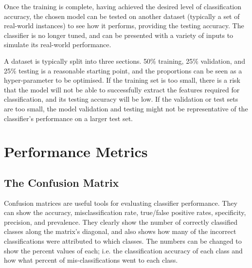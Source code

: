 Once the training is complete, having achieved the desired level of classification accuracy, the chosen model can be tested on another dataset (typically a  set of real-world instances) to see how it performs, providing the testing accuracy. The classifier is no longer tuned, and can be presented with a variety of inputs to simulate its real-world performance.

A dataset is typically split into three sections. 50\% training, 25\% validation, and 25\% testing is a reasonable starting point, and the proportions can be seen as a hyper-parameter to be optimised. If the training set is too small, there is a risk that the model will not be able to successfully extract the features required for classification, and its testing accuracy will be low. If the validation or test sets are too small, the model validation and testing might not be representative of the classifier's performance on a larger test set.

\section{Performance Metrics}
\subsection{The Confusion Matrix}
Confusion matrices are useful tools for evaluating classifier performance. They can show the accuracy, misclassification rate, true/false positive rates, specificity, precision, and prevalence. They clearly show the number of correctly classified classes along the matrix's diagonal, and also shows how many of the incorrect classifications were attributed to which classes. The numbers can be changed to show the percent values of each; i.e. the classification accuracy of each class and how what percent of mis-classifications went to each class.





